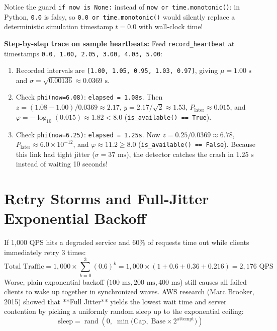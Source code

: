 Notice the guard \texttt{if now is None:} instead of \texttt{now or time.monotonic()}: in Python, \texttt{0.0} is falsy, so \texttt{0.0 or time.monotonic()} would silently replace a deterministic simulation timestamp $t = 0.0$ with wall-clock time!

\textbf{Step-by-step trace on sample heartbeats:} Feed \texttt{record\_heartbeat} at timestamps \texttt{0.0, 1.00, 2.05, 3.00, 4.03, 5.00}:
\begin{enumerate}[leftmargin=18pt]
  \item Recorded intervals are \texttt{[1.00, 1.05, 0.95, 1.03, 0.97]}, giving $\mu = 1.00\text{ s}$ and $\sigma = \sqrt{0.00136} \approx 0.0369\text{ s}$.
  \item Check \texttt{phi(now=6.08)}: \texttt{elapsed = 1.08s}. Then $z = (1.08 - 1.00)/0.0369 \approx 2.17$, $y = 2.17 / \sqrt{2} \approx 1.53$, $P_{\text{later}} \approx 0.015$, and $\varphi = -\log_{10}(0.015) \approx 1.82 < 8.0$ (\texttt{is\_available() == True}).
  \item Check \texttt{phi(now=6.25)}: \texttt{elapsed = 1.25s}. Now $z = 0.25 / 0.0369 \approx 6.78$, $P_{\text{later}} \approx 6.0 \times 10^{-12}$, and $\varphi \approx 11.2 \ge 8.0$ (\texttt{is\_available() == False}). Because this link had tight jitter ($\sigma = 37\text{ ms}$), the detector catches the crash in $1.25\text{ s}$ instead of waiting 10 seconds!
\end{enumerate}

\section{Retry Storms and Full-Jitter Exponential Backoff}

If 1,000 QPS hits a degraded service and 60\% of requests time out while clients immediately retry 3 times:
\begin{equation}
\text{Total Traffic} = 1{,}000 \times \sum_{k=0}^{3} (0.6)^k = 1{,}000 \times (1 + 0.6 + 0.36 + 0.216) = 2{,}176\text{ QPS}
\end{equation}
Worse, plain exponential backoff ($100\text{ ms}, 200\text{ ms}, 400\text{ ms}$) still causes all failed clients to wake up together in synchronized waves. AWS research (Marc Brooker, 2015) showed that **Full Jitter** yields the lowest wait time and server contention by picking a uniformly random sleep up to the exponential ceiling:
\begin{equation}
\text{sleep} = \operatorname{rand}\!\left(0,\; \min\!\bigl(\text{Cap},\; \text{Base} \times 2^{\text{attempt}}\bigr)\right)
\end{equation}


